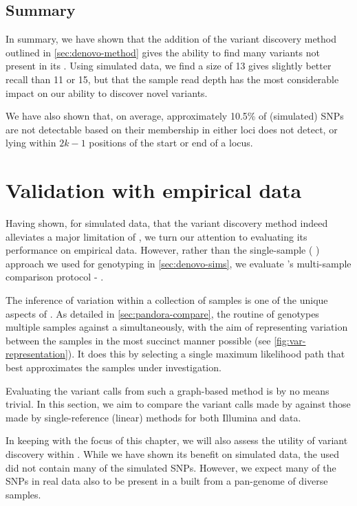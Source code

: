 \subsection{Summary}

In summary, we have shown that the addition of the \denovo{} variant discovery method outlined in \autoref{sec:denovo-method} gives \pandora{} the ability to find many variants not present in its \panrg{}. Using simulated data, we find a \kmer{} size of 13 gives slightly better recall than 11 or 15, but that the sample read depth has the most considerable impact on our ability to discover novel variants.

We have also shown that, on average, approximately 10.5\% of (simulated) SNPs are not detectable based on their membership in either loci \pandora{} does not detect, or lying within $2k-1$ positions of the start or end of a locus.

\section{Validation with empirical data}
\label{sec:denovo-empirical}

Having shown, for simulated data, that the \denovo{} variant discovery method indeed alleviates a major limitation of \pandora{}, we turn our attention to evaluating its performance on empirical data. However, rather than the single-sample (\pandora{} ) approach we used for genotyping in \autoref{sec:denovo-sims}, we evaluate \pandora{}'s multi-sample comparison protocol - \compare{}.

The inference of variation within a collection of samples is one of the unique aspects of \pandora{}. As detailed in \autoref{sec:pandora-compare}, the  routine of \pandora{} genotypes multiple samples against a \panrg{} simultaneously, with the aim of representing variation between the samples in the most succinct manner possible (see \autoref{fig:var-representation}). It does this by selecting a single maximum likelihood path that best approximates the samples under investigation.

Evaluating the variant calls from such a graph-based method is by no means trivial. In this section, we aim to compare the variant calls made by \pandora{} against those made by single-reference (linear) methods for both Illumina and \ont{} data.

In keeping with the focus of this chapter, we will also assess the utility of \denovo{} variant discovery within \pandora{}. While we have shown its benefit on simulated data, the \panrg{} used did not contain many of the simulated SNPs. However, we expect many of the SNPs in real data also to be present in a \panrg{} built from a pan-genome of diverse samples. 

